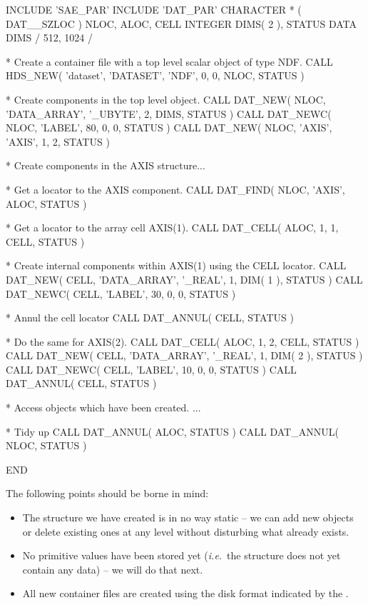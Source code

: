 \documentclass[twoside,11pt]{starlink}
\providecommand{\st}[1]{{\emph{#1}}}
\begin{document}
\begin{small}
\begin{terminalv}
      INCLUDE 'SAE_PAR'
      INCLUDE 'DAT_PAR'
      CHARACTER * ( DAT__SZLOC ) NLOC, ALOC, CELL
      INTEGER DIMS( 2 ), STATUS
      DATA DIMS / 512, 1024 /

*  Create a container file with a top level scalar object of type NDF.
      CALL HDS_NEW( 'dataset', 'DATASET', 'NDF', 0, 0, NLOC, STATUS )

*  Create components in the top level object.
      CALL DAT_NEW( NLOC, 'DATA_ARRAY', '_UBYTE', 2, DIMS, STATUS )
      CALL DAT_NEWC( NLOC, 'LABEL', 80, 0, 0, STATUS )
      CALL DAT_NEW( NLOC, 'AXIS', 'AXIS', 1, 2, STATUS )

*  Create components in the AXIS structure...

*  Get a locator to the AXIS component.
      CALL DAT_FIND( NLOC, 'AXIS', ALOC, STATUS )

*  Get a locator to the array cell AXIS(1).
      CALL DAT_CELL( ALOC, 1, 1, CELL, STATUS )

*  Create internal components within AXIS(1) using the CELL locator.
      CALL DAT_NEW( CELL, 'DATA_ARRAY', '_REAL', 1, DIM( 1 ), STATUS )
      CALL DAT_NEWC( CELL, 'LABEL', 30, 0, 0, STATUS )

*  Annul the cell locator
      CALL DAT_ANNUL( CELL, STATUS )

*  Do the same for AXIS(2).
      CALL DAT_CELL( ALOC, 1, 2, CELL, STATUS )
      CALL DAT_NEW( CELL, 'DATA_ARRAY', '_REAL', 1, DIM( 2 ), STATUS )
      CALL DAT_NEWC( CELL, 'LABEL', 10, 0, 0, STATUS )
      CALL DAT_ANNUL( CELL, STATUS )

*  Access objects which have been created.
      ...

*  Tidy up
      CALL DAT_ANNUL( ALOC, STATUS )
      CALL DAT_ANNUL( NLOC, STATUS )

      END
\end{terminalv}
\end{small}

The following points should be borne in mind:

\begin{itemize}

\item The structure we have created is in no way static -- we can add
new objects or delete existing ones at any level without disturbing
what already exists.

\item No primitive values have been stored yet (\st{i.e.}\ the
structure does not yet contain any data) -- we will do that next.

\item All new container files are created using the disk format indicated
by the .

\end{itemize}
\end{document}
